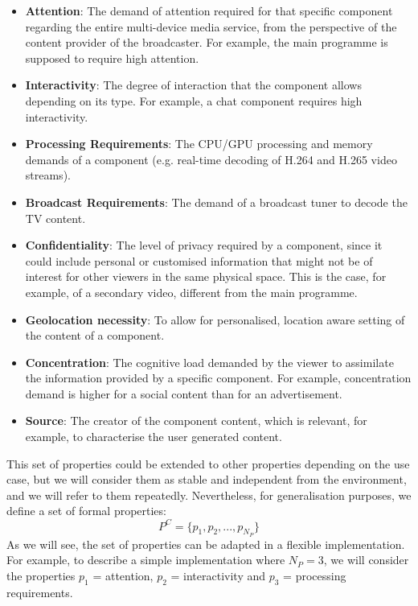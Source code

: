 \begin{itemize}
	\item \textbf{Attention}: The demand of attention required for that specific component regarding the entire multi-device media service, from the perspective of the content provider of the broadcaster. For example, the main programme is supposed to require high attention.
	\item \textbf{Interactivity}: The degree of interaction that the component allows depending on its type. For example, a chat component requires high interactivity.  
	\item \textbf{Processing Requirements}: The CPU/GPU processing and memory demands of a component (e.g. real-time decoding of H.264 and H.265 video streams). 
	\item \textbf{Broadcast Requirements}: The demand of a broadcast tuner to decode the TV content. 
	\item \textbf{Confidentiality}: The level of privacy required by a component, since it could include personal or customised information that might not be of interest for other viewers in the same physical space. This is the case, for example, of a secondary video, different from the main programme.
	\item \textbf{Geolocation necessity}: To allow for personalised, location aware setting of the content of a component.
	\item \textbf{Concentration}: The cognitive load demanded by the viewer to assimilate the information provided by a specific component. For example, concentration demand is higher for a social content than for an advertisement.
	\item \textbf{Source}: The creator of the component content, which is relevant, for example, to characterise the user generated content.
\end{itemize}

This set of properties could be extended to other properties depending on the use case, but we will consider them as stable and independent from the environment, and we will refer to them repeatedly. Nevertheless, for generalisation purposes, we define a set of formal properties:
\begin{equation}
P^{C} = \{ p_1, p_2, ..., p_{N_{P}} \}
\end{equation}
As we will see, the set of properties can be adapted in a flexible implementation.
For example, to describe a simple implementation where $N_P=3$, we will consider the properties $p_1$ = attention, $p_2$ = interactivity and $p_3$ = processing requirements.



